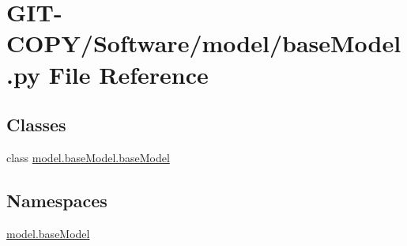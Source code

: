 \hypertarget{GIT-COPY_2Software_2model_2baseModel_8py}{}\section{G\+I\+T-\/\+C\+O\+P\+Y/\+Software/model/base\+Model.py File Reference}
\label{GIT-COPY_2Software_2model_2baseModel_8py}
\subsection*{Classes}
\begin{DoxyCompactItemize}
\item 
class \hyperlink{classmodel_1_1baseModel_1_1baseModel}{model.\+base\+Model.\+base\+Model}
\end{DoxyCompactItemize}
\subsection*{Namespaces}
\begin{DoxyCompactItemize}
\item 
 \hyperlink{namespacemodel_1_1baseModel}{model.\+base\+Model}
\end{DoxyCompactItemize}
